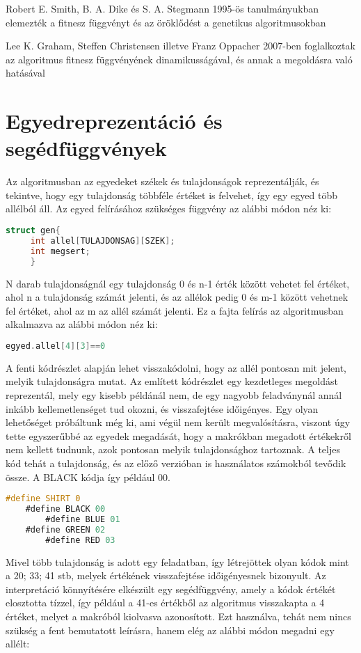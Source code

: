 \documentclass[12pt,a4paper,oneside]{report}
\begin{document}
Robert E. Smith, B. A. Dike és S. A. Stegmann	1995-ös tanulmányukban elemezték a fitnesz függvényt és az öröklődést a genetikus algoritmusokban\cite{Smith:1995:FIG:315891.316014}   

Lee K. Graham, Steffen Christensen illetve Franz Oppacher 2007-ben foglalkoztak az algoritmus fitnesz függvényének dinamikusságával, és annak a megoldásra való hatásával\cite{Graham:2007:SGA:1276958.1277243}

    \section{Egyedreprezentáció és segédfüggvények} %

	
			Az algoritmusban az egyedeket székek és tulajdonságok reprezentálják, és tekintve, hogy egy tulajdonság többféle értéket is felvehet, így egy egyed több allélból áll. Az egyed felírásához szükséges függvény az alábbi módon néz ki:

	\begin{lstlisting}[frame=single, language=C]
	struct gen{
   	 int allel[TULAJDONSAG][SZEK];
   	 int megsert;
   	 }
	\end{lstlisting}
	
			N darab tulajdonságnál egy tulajdonság 0 és n-1 érték között vehetet fel értéket, ahol n a tulajdonság számát jelenti, és az allélok pedig 0 és m-1 között vehetnek fel értéket, ahol az m az allél számát jelenti. Ez a fajta felírás az algoritmusban alkalmazva az alábbi 		módon néz ki:
	\begin{lstlisting}[frame=single, language=C]
	egyed.allel[4][3]==0
	\end{lstlisting}
			
	A fenti kódrészlet alapján lehet visszakódolni, hogy az allél pontosan mit jelent, melyik tulajdonságra mutat. Az említett kódrészlet egy kezdetleges megoldást reprezentál, mely egy kisebb példánál nem, de egy nagyobb feladványnál annál inkább kellemetlenséget tud okozni, és visszafejtése időigényes.
	Egy olyan lehetőséget próbáltunk még ki, ami végül nem került megvalósításra, viszont úgy tette egyszerűbbé az egyedek megadását, hogy a makrókban megadott értékekről nem kellett tudnunk,  azok pontosan melyik tulajdonsághoz tartoznak. A teljes kód tehát a tulajdonság, és az előző verzióban is használatos számokból tevődik össze. A BLACK kódja így például 00. 
	\begin{lstlisting}[frame=single, language=C]
	#define SHIRT 0
 	#define BLACK 00
    	#define BLUE 01
	#define GREEN 02
    	#define RED 03 
	\end{lstlisting}
			Mivel több tulajdonság is adott egy feladatban, így létrejöttek olyan kódok mint a 20; 33; 41 stb, melyek értékének visszafejtése időigényesnek bizonyult. Az interpretáció könnyítésére elkészült egy segédfüggvény, amely a kódok értékét elosztotta tízzel, így például a 41-es értékből az algoritmus visszakapta a 4 értéket, melyet a makróból kiolvasva azonosított. 
Ezt használva, tehát nem nincs szükség a fent bemutatott leírásra, hanem elég az alábbi módon megadni egy allélt:
\end{document}
